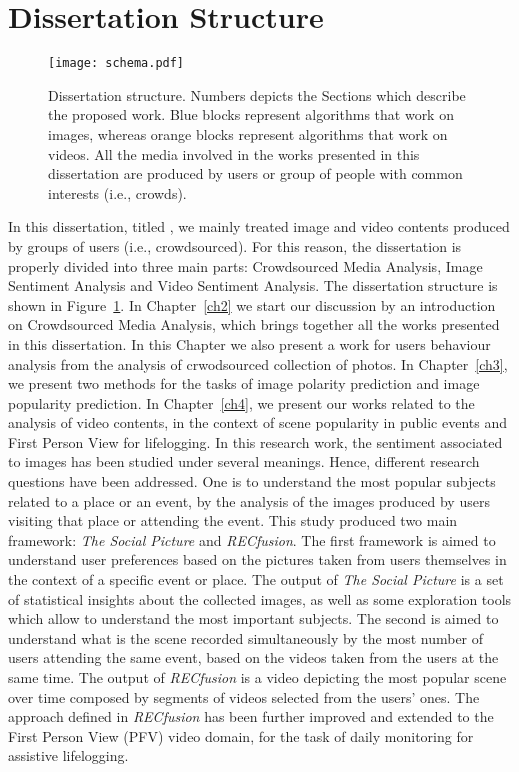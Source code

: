 \section{Dissertation Structure}
\begin{figure}[t]
	\centering
	\texttt{[image: schema.pdf]}
	\caption{Dissertation structure. Numbers depicts the Sections which describe the proposed work. Blue blocks represent algorithms that work on images, whereas orange blocks represent algorithms that work on videos. All the media involved in the works presented in this dissertation are produced by users or group of people with common interests (i.e., crowds).
	}
	\label{figDissertationSchema}
\end{figure}
In this dissertation, titled , we mainly treated image and video contents produced by groups of users (i.e., crowdsourced).
For this reason, the dissertation is properly divided into three main parts: Crowdsourced Media Analysis, Image Sentiment Analysis and Video Sentiment Analysis.
The dissertation structure is shown in Figure~\ref{figDissertationSchema}. In Chapter~\ref{ch2} we start our discussion by an introduction on Crowdsourced Media Analysis, which brings together all the works presented in this dissertation. In this Chapter we also present a work for users behaviour analysis from the analysis of crwodsourced collection of photos. %
In Chapter~\ref{ch3}, we present two methods for the tasks of image polarity prediction and image popularity prediction.
In Chapter~\ref{ch4}, we present our works related to the analysis of video contents, in the context of scene popularity in public events and First Person View for lifelogging.
In this research work, the sentiment associated to images has been studied under several meanings. Hence, different research questions have been addressed. 
One is to understand the most popular subjects related to a place or an event, by the analysis of the images produced by users visiting that place or attending the event. This study produced two main framework: \textit{The Social Picture} and \textit{RECfusion}. The first framework is aimed to understand user preferences based on the pictures taken from users themselves in the context of a specific event or place. The output of \textit{The Social Picture} is a set of statistical insights about the collected images, as well as some exploration tools which allow to understand the most important subjects. The second is aimed to understand what is the scene recorded simultaneously by the most number of users attending the same event, based on the videos taken from the users at the same time. The output of \textit{RECfusion} is a video depicting the most popular scene over time composed by segments of videos selected from the users' ones.
The approach defined in \textit{RECfusion} has been further improved and extended to the First Person View (PFV) video domain, for the task of daily monitoring for assistive lifelogging.


